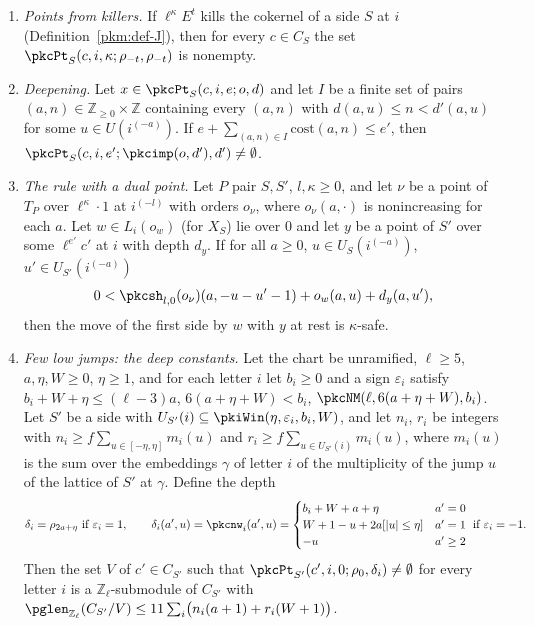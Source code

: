\documentclass[10pt]{amsart}
\theoremstyle{definition}
\theoremstyle{remark}
\newcommand{\Z}{\mathbb Z}
\begin{document}
\begin{enumerate}
\item[(I1)] \emph{Points from killers.} If $\ell^\kappa E^t$ kills the cokernel of a side $S$ at $i$
(Definition~\ref{pkm:def-J}), then for every $c\in C_S$ the set $\pkcPt_S(c,i,\kappa;\rho_{-t},\rho_{-t})$
is nonempty.
\item[(I2)] \emph{Deepening.} Let $x\in\pkcPt_S(c,i,e;o,d)$ and let $I$ be a finite set of pairs
$(a,n)\in\Z_{\ge0}\times\Z$ containing every $(a,n)$ with $d(a,u)\le n<d'(a,u)$ for some $u\in
U(i^{(-a)})$. If $e+\sum_{(a,n)\in I}\mathrm{cost}(a,n)\le e'$, then
$\pkcPt_S(c,i,e';\pkcimp(o,d'),d')\ne\emptyset$.
\item[(I3)] \emph{The rule with a dual point.} Let $P$ pair $S,S'$, $l,\kappa\ge0$, and let $\nu$ be a
point of $T_P$ over $\ell^\kappa\cdot1$ at $i^{(-l)}$ with orders $o_\nu$, where $o_\nu(a,\cdot)$ is
nonincreasing for each $a$. Let $w\in L_i(o_w)$ (for $X_S$) lie over $0$ and let $y$ be a point of
$S'$ over some $\ell^{e'}c'$ at $i$ with depth $d_y$. If for all $a\ge0$, $u\in U_S(i^{(-a)})$,
$u'\in U_{S'}(i^{(-a)})$
\[
0<\pkcsh_{l,0}(o_\nu)(a,-u-u'-1)+o_w(a,u)+d_y(a,u'),
\]
then the move of the first side by $w$ with $y$ at rest is $\kappa$-safe.
\item[(I4)] \emph{Few low jumps: the deep constants.} Let the chart be unramified, $\ell\ge5$,
$a,\eta,W\ge0$, $\eta\ge1$, and for each letter $i$ let $b_i\ge0$ and a sign $\varepsilon_i$ satisfy
$b_i+W+\eta\le(\ell-3)a$, $6(a+\eta+W)<b_i$, $\pkcNM(\ell,6(a+\eta+W),b_i)$. Let $S'$ be a side with
$U_{S'}(i)\subseteq\pkiWin(\eta,\varepsilon_i,b_i,W)$, and let $n_i$, $r_i$ be integers with $n_i\ge
f\sum_{u\in[-\eta,\eta]}m_i(u)$ and $r_i\ge f\sum_{u\in U_{S'}(i)}m_i(u)$, where $m_i(u)$ is the sum
over the embeddings $\gamma$ of letter $i$ of the multiplicity of the jump $u$ of the lattice of $S'$
at $\gamma$. Define the depth
\[
\delta_i=\rho_{2a+\eta}\ \text{if }\varepsilon_i=1,\qquad
\delta_i(a',u)=\pkcnw_i(a',u)=\begin{cases}b_i+W+a+\eta&a'=0\\ W+1-u+2a[|u|\le\eta]&a'=1\\
-u&a'\ge2\end{cases}\ \text{if }\varepsilon_i=-1 .
\]
Then the set $V$ of $c'\in C_{S'}$ such that $\pkcPt_{S'}(c',i,0;\rho_0,\delta_i)\ne\emptyset$ for
every letter $i$ is a $\Z_\ell$-submodule of $C_{S'}$ with
$\pglen_{\Z_\ell}(C_{S'}/V)\le11\sum_i\bigl(n_i(a+1)+r_i(W+1)\bigr)$.
\end{enumerate}
\end{document}
